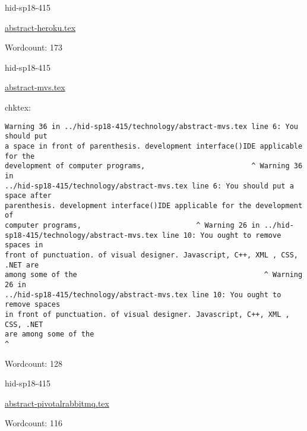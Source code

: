 

\begin{IU}

hid-sp18-415

\href{https://github.com/cloudmesh-community/hid-sp18-415/blob/master//technology/abstract-heroku.tex}{abstract-heroku.tex}

 

Wordcount: 173

\end{IU}



\begin{IU}

hid-sp18-415

\href{https://github.com/cloudmesh-community/hid-sp18-415/blob/master//technology/abstract-mvs.tex}{abstract-mvs.tex}

 
chktex:
\begin{tiny}
\begin{verbatim}
Warning 36 in ../hid-sp18-415/technology/abstract-mvs.tex line 6: You should put
a space in front of parenthesis. development interface()IDE applicable for the
development of computer programs,                         ^ Warning 36 in
../hid-sp18-415/technology/abstract-mvs.tex line 6: You should put a space after
parenthesis. development interface()IDE applicable for the development of
computer programs,                           ^ Warning 26 in ../hid-
sp18-415/technology/abstract-mvs.tex line 10: You ought to remove spaces in
front of punctuation. of visual designer. Javascript, C++, XML , CSS, .NET are
among some of the                                            ^ Warning 26 in
../hid-sp18-415/technology/abstract-mvs.tex line 10: You ought to remove spaces
in front of punctuation. of visual designer. Javascript, C++, XML , CSS, .NET
are among some of the                                                   ^
\end{verbatim}
\end{tiny}

Wordcount: 128

\end{IU}



\begin{IU}

hid-sp18-415

\href{https://github.com/cloudmesh-community/hid-sp18-415/blob/master//technology/abstract-pivotalrabbitmq.tex}{abstract-pivotalrabbitmq.tex}

 

Wordcount: 116

\end{IU}

